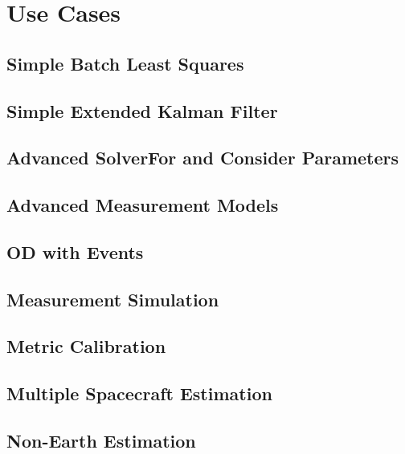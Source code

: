 \section{Use Cases}

\subsection{Simple Batch Least Squares}

\subsection{Simple Extended Kalman Filter}

\subsection{Advanced SolverFor and Consider Parameters}

\subsection{Advanced Measurement Models}

\subsection{OD with Events}

\subsection{Measurement Simulation}

\subsection{Metric Calibration}

\subsection{Multiple Spacecraft Estimation}

\subsection{Non-Earth Estimation}
